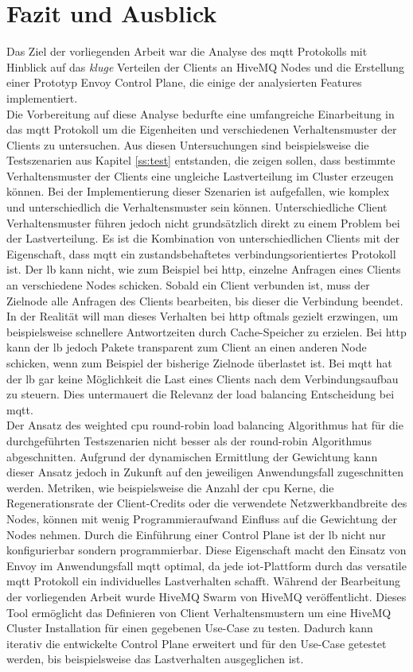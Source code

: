 \section{Fazit und Ausblick}
Das Ziel der vorliegenden Arbeit war die Analyse des \ac{mqtt} Protokolls mit Hinblick auf das \textit{kluge} Verteilen der Clients an HiveMQ Nodes und die Erstellung einer Prototyp Envoy Control Plane, die einige der analysierten Features implementiert.
\\
Die Vorbereitung auf diese Analyse bedurfte eine umfangreiche Einarbeitung in das \ac{mqtt} Protokoll um die Eigenheiten und verschiedenen Verhaltensmuster der Clients zu untersuchen. Aus diesen Untersuchungen sind beispielsweise die Testszenarien aus Kapitel \ref{ss:test} entstanden, die zeigen sollen, dass bestimmte Verhaltensmuster der Clients eine ungleiche Lastverteilung im Cluster erzeugen können. Bei der Implementierung dieser Szenarien ist aufgefallen, wie komplex und unterschiedlich die Verhaltensmuster sein können.
Unterschiedliche Client Verhaltensmuster führen jedoch nicht grundsätzlich direkt zu einem Problem bei der Lastverteilung. Es ist die Kombination von unterschiedlichen Clients mit der Eigenschaft, dass \ac{mqtt} ein zustandsbehaftetes verbindungsorientiertes Protokoll ist.
Der \acl{lb} kann nicht, wie zum Beispiel bei \ac{http}, einzelne Anfragen eines Clients an verschiedene Nodes schicken. Sobald ein Client verbunden ist, muss der Zielnode alle Anfragen des Clients bearbeiten, bis dieser die Verbindung beendet.
In der Realität will man dieses Verhalten bei \ac{http} oftmals gezielt erzwingen, um beispielsweise schnellere Antwortzeiten durch Cache-Speicher zu erzielen. Bei \ac{http} kann der \acl{lb} jedoch Pakete transparent zum Client an einen anderen Node schicken, wenn zum Beispiel der bisherige Zielnode überlastet ist. Bei \ac{mqtt} hat der \acl{lb} gar keine Möglichkeit die Last eines Clients nach dem Verbindungsaufbau zu steuern.
Dies untermauert die Relevanz der load balancing Entscheidung bei \ac{mqtt}.
\\
Der Ansatz des weighted \ac{cpu} round-robin load balancing Algorithmus hat für die durchgeführten Testszenarien nicht besser als der round-robin Algorithmus abgeschnitten. Aufgrund der dynamischen Ermittlung der Gewichtung kann dieser Ansatz jedoch in Zukunft auf den jeweiligen Anwendungsfall zugeschnitten werden.
Metriken, wie beispielsweise die Anzahl der \ac{cpu} Kerne, die Regenerationsrate der Client-Credits oder die verwendete Netzwerkbandbreite des Nodes, können mit wenig Programmieraufwand Einfluss auf die Gewichtung der Nodes nehmen.
Durch die Einführung einer Control Plane ist der \acl{lb} nicht nur konfigurierbar sondern programmierbar. Diese Eigenschaft macht den Einsatz von Envoy im Anwendungsfall \ac{mqtt} optimal, da jede \ac{iot}-Plattform durch das versatile \ac{mqtt} Protokoll ein individuelles Lastverhalten schafft.
Während der Bearbeitung der vorliegenden Arbeit wurde HiveMQ Swarm von HiveMQ veröffentlicht. Dieses Tool ermöglicht das Definieren von Client Verhaltensmustern um eine HiveMQ Cluster Installation für einen gegebenen Use-Case zu testen. Dadurch kann iterativ die entwickelte Control Plane erweitert und für den Use-Case getestet werden, bis beispielsweise das Lastverhalten ausgeglichen ist.


